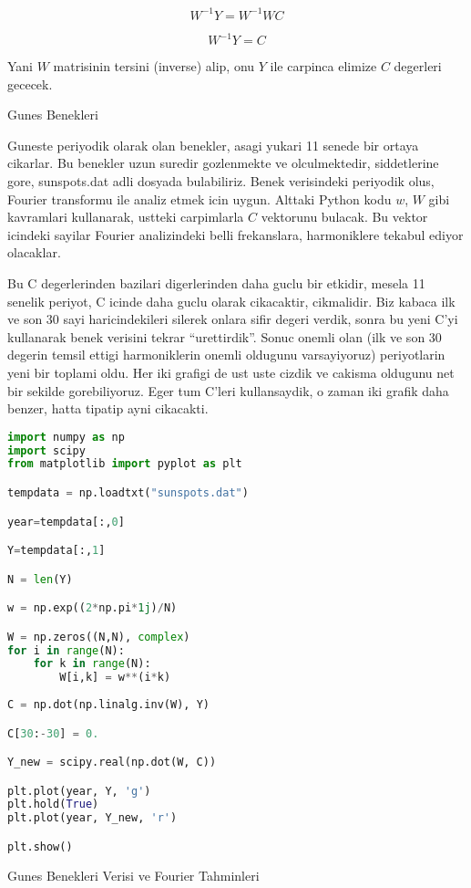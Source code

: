 \documentclass[12pt,fleqn]{article}\usepackage{../common}
\begin{document}
\[ W^{-1}Y = W^{-1}WC  \]

\[ W^{-1}Y = C \]

Yani $W$ matrisinin tersini (inverse) alip, onu $Y$ ile carpinca elimize $C$
degerleri gececek. 

Gunes Benekleri

Guneste periyodik olarak olan benekler, asagi yukari 11 senede bir ortaya
cikarlar. Bu benekler uzun suredir gozlenmekte ve olculmektedir, siddetlerine
gore, sunspots.dat adli dosyada bulabiliriz. Benek verisindeki periyodik olus,
Fourier transformu ile analiz etmek icin uygun. Alttaki Python kodu $w$, $W$
gibi kavramlari kullanarak, ustteki carpimlarla $C$ vektorunu bulacak. Bu vektor
icindeki sayilar Fourier analizindeki belli frekanslara, harmoniklere tekabul
ediyor olacaklar.

Bu C degerlerinden bazilari digerlerinden daha guclu bir etkidir, mesela 11
senelik periyot, C icinde daha guclu olarak cikacaktir, cikmalidir. Biz kabaca
ilk ve son 30 sayi haricindekileri silerek onlara sifir degeri verdik, sonra bu
yeni C'yi kullanarak benek verisini tekrar ``urettirdik''. Sonuc onemli olan
(ilk ve son 30 degerin temsil ettigi harmoniklerin onemli oldugunu varsayiyoruz)
periyotlarin yeni bir toplami oldu. Her iki grafigi de ust uste cizdik ve
cakisma oldugunu net bir sekilde gorebiliyoruz. Eger tum C'leri kullansaydik, o
zaman iki grafik daha benzer, hatta tipatip ayni cikacakti.

\begin{lstlisting}[language=Python]
import numpy as np
import scipy
from matplotlib import pyplot as plt

tempdata = np.loadtxt("sunspots.dat")

year=tempdata[:,0]

Y=tempdata[:,1]

N = len(Y)

w = np.exp((2*np.pi*1j)/N)

W = np.zeros((N,N), complex)
for i in range(N):
    for k in range(N):
        W[i,k] = w**(i*k)
        
C = np.dot(np.linalg.inv(W), Y) 

C[30:-30] = 0.

Y_new = scipy.real(np.dot(W, C))

plt.plot(year, Y, 'g')
plt.hold(True)
plt.plot(year, Y_new, 'r')

plt.show()
\end{lstlisting}

Gunes Benekleri Verisi ve Fourier Tahminleri
\end{document}
